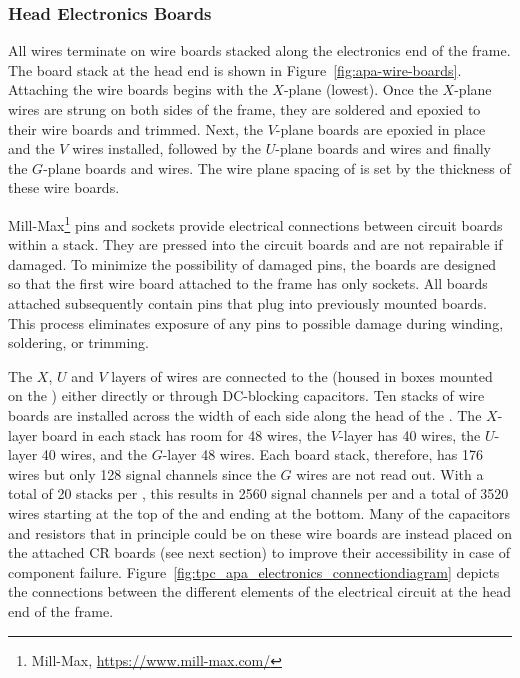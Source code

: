\subsubsection{Head Electronics Boards}
\label{sec:fdsp-apa-headboards}
All  wires terminate on wire boards stacked along the electronics end of the  frame.  The board stack at the head end is shown in Figure~\ref{fig:apa-wire-boards}. Attaching the wire boards begins with the $X$-plane (lowest). Once the $X$-plane wires are strung on both sides of the  frame, they are soldered and epoxied to their wire boards and trimmed. Next, the $V$-plane boards are epoxied in place and the $V$ wires installed, followed by the $U$-plane boards and wires and finally the $G$-plane boards and wires. The wire plane spacing of \planespace %
is set by the thickness of these wire boards.   

Mill-Max\footnote{Mill-Max\texttrademark{}, \url{https://www.mill-max.com/}} pins and sockets provide electrical connections between circuit boards within a stack. They are pressed into the circuit boards and are not repairable if damaged. To minimize the possibility of damaged pins, the boards are designed so that the first wire board attached to the frame has only sockets. All boards attached subsequently contain pins that plug into previously mounted boards. This process eliminates exposure of any pins to possible damage during winding, soldering, or trimming.

The $X$, $U$ and $V$ layers of wires are connected to the  (housed in boxes mounted on the ) either directly or through DC-blocking capacitors.  Ten stacks of wire boards are installed across the width of each side along the head of the .  The $X$-layer board in each stack has room for \num{48} wires, the $V$-layer has 40 wires, the $U$-layer \num{40} wires, and the $G$-layer \num{48} wires.  Each board stack, therefore, has \num{176} wires but only \num{128} signal channels since the $G$ wires are not read out. With a total of \num{20} stacks per , this results in \num{2560} signal channels per  and a total of \num{3520} wires starting at the top of the  and ending at the bottom. Many of the capacitors and resistors that in principle could be on these wire boards are instead placed on the attached CR boards (see next section) to improve their accessibility in case of component failure. Figure~\ref{fig:tpc_apa_electronics_connectiondiagram} depicts the connections between the different elements of the  electrical circuit at the head end of the frame. 

